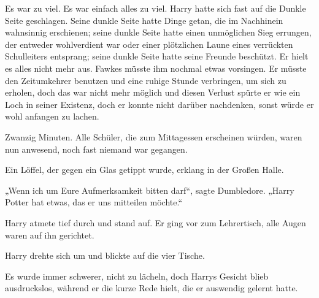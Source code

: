Es war zu viel. Es war einfach alles zu viel. Harry hatte sich fast auf die Dunkle Seite geschlagen. Seine dunkle Seite hatte Dinge getan, die im Nachhinein wahnsinnig erschienen; seine dunkle Seite hatte einen unmöglichen Sieg errungen, der entweder wohlverdient war oder einer plötzlichen Laune eines verrückten Schulleiters entsprang; seine dunkle Seite hatte seine Freunde beschützt. Er hielt es alles nicht mehr aus. Fawkes müsste ihm nochmal etwas vorsingen. Er müsste den Zeitumkehrer benutzen und eine ruhige Stunde verbringen, um sich zu erholen, doch das war nicht mehr möglich und diesen Verlust spürte er wie ein Loch in seiner Existenz, doch er konnte nicht darüber nachdenken, sonst würde er wohl anfangen zu lachen.

Zwanzig Minuten. Alle Schüler, die zum Mittagessen erscheinen würden, waren nun anwesend, noch fast niemand war gegangen.

Ein Löffel, der gegen ein Glas getippt wurde, erklang in der Großen Halle.

„Wenn ich um Eure Aufmerksamkeit bitten darf“, sagte Dumbledore. „Harry Potter hat etwas, das er uns mitteilen möchte.“

Harry atmete tief durch und stand auf. Er ging vor zum Lehrertisch, alle Augen waren auf ihn gerichtet.

Harry drehte sich um und blickte auf die vier Tische.

Es wurde immer schwerer, nicht zu lächeln, doch Harrys Gesicht blieb ausdruckslos, während er die kurze Rede hielt, die er auswendig gelernt hatte.

